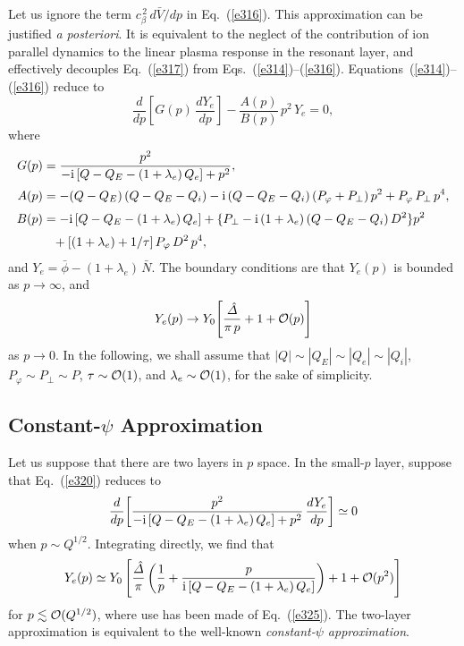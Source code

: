\documentclass[12pt,prb,aps]{revtex4-1}
\providecommand{\DIFaddbegin}{} %
\providecommand{\DIFaddend}{} %
\begin{document}
Let us ignore the term $c_\beta^{\,2}\,d\bar{V}/dp$ in Eq.~(\ref{e316}). This approximation can
be justified {\em a posteriori}. It is equivalent to the neglect of the contribution of ion parallel dynamics to the linear  plasma
response in the resonant layer, and effectively decouples Eq.~(\ref{e317}) from Eqs.~(\ref{e314})--(\ref{e316}).\cite{cole,ber} Equations~(\ref{e314})--(\ref{e316}) reduce to\,\cite{cole}
\begin{equation}\label{e320}
\frac{d}{dp}\!\left[G(p)\,\frac{dY_e}{dp}\right] - \frac{A(p)}{B(p)}\,p^{2}\,Y_e = 0,
\end{equation}
where
\begin{align}
G(p)&= \frac{p^2}{-{\rm i}\,[Q-Q_E-(1+\lambda_e)\,Q_e] + p^2},\\[0.5ex]
 A(p) &= -(Q-Q_E)\,(Q-Q_E-Q_i)-{\rm i}\,(Q-Q_E-Q_i)\,(P_\varphi+P_\perp)\,p^2 + P_\varphi\,P_\perp\,p^4,\DIFaddbegin \label{e45}\DIFaddend \\[0.5ex]
 B(p) &= 
-{\rm i}\,[Q-Q_E-(1+\lambda_e)\,Q_e] +\{P_\perp - {\rm i}\,(1+\lambda_e)\,(Q-Q_E-Q_i)\,D^2\}p^2\nonumber\\[0.5ex]
&\phantom{=}+[(1+\lambda_e)+1/\tau]\,P_\varphi\,D^2\,p^4,
\end{align}
and $Y_e=\bar{\phi} - (1+\lambda_e)\,\bar{N}$. The boundary conditions are that $Y_e(p)$ is bounded as $p\rightarrow\infty$, and
\begin{equation}\label{e325}
Y_e(p)\rightarrow Y_0\!\left[\frac{\hat{\mit\Delta}}{\pi\,p} + 1+ {\cal O}(p)\right]
\end{equation}
as $p\rightarrow 0$. In the following, we shall assume that $|Q|\sim |Q_E|\sim |Q_e|\sim |Q_i|$, $P_\varphi\sim P_\perp \sim P$, $\tau\sim {\cal O}(1)$, and $\lambda_e\sim{\cal O}(1)$,  for the
sake of simplicity. 

\subsection{Constant-$\psi$ Approximation}\label{s5.6}
Let us suppose that there are two layers in $p$ space. In the small-$p$ layer, suppose that Eq.~(\ref{e320}) reduces to
\begin{equation}
\frac{d}{dp}\!\left[\frac{p^2}{-{\rm i}\,[Q-Q_E-(1+\lambda_e)\,Q_e] + p^2}\,\frac{dY_e}{dp}\right]\simeq 0
\end{equation}
when $p\sim Q^{1/2}$. Integrating directly, we find that
\begin{equation}
Y_e(p) \simeq Y_0 \left[\frac{\hat{\mit\Delta}}{\pi}\left(\frac{1}{p} + \frac{p}{{\rm i}\,[Q-Q_E-(1+\lambda_e)\,Q_e]}\right) + 1 + {\cal O}(p^2)\right]
\end{equation}
for $p\lesssim {\cal O}(Q^{1/2})$, where use has been made of Eq.~(\ref{e325}). The two-layer  approximation is
equivalent to the well-known {\em constant-$\psi$ approximation}.\cite{fkr}
\end{document}
